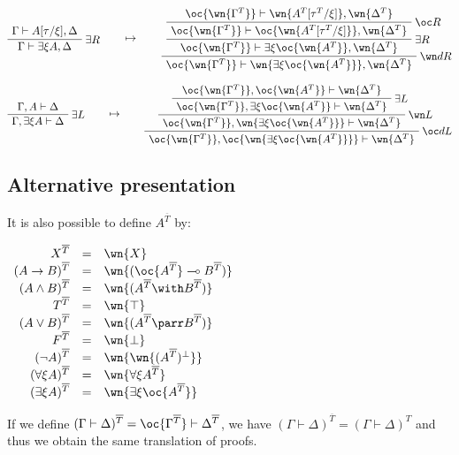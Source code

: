 \(\AxRule{\Gamma\vdash A[\tau/\xi],\Delta}
\LabelRule{\exists R}
\UnaRule{\Gamma\vdash \exists\xi A,\Delta}
\DisplayProof
\qquad\mapsto\qquad
\AxRule{\oc{\wn{\Gamma^T}}\vdash \wn{A^T[\tau^T/\xi]},\wn{\Delta^T}}
\LabelRule{\oc R}
\UnaRule{\oc{\wn{\Gamma^T}}\vdash \oc{\wn{A^T[\tau^T/\xi]}},\wn{\Delta^T}}
\LabelRule{\exists R}
\UnaRule{\oc{\wn{\Gamma^T}}\vdash \exists\xi \oc{\wn{A^T}},\wn{\Delta^T}}
\LabelRule{\wn d R}
\UnaRule{\oc{\wn{\Gamma^T}}\vdash \wn{\exists\xi \oc{\wn{A^T}}},\wn{\Delta^T}}
\DisplayProof\)

\(\AxRule{\Gamma,A\vdash \Delta}
\LabelRule{\exists L}
\UnaRule{\Gamma,\exists\xi A\vdash \Delta}
\DisplayProof
\qquad\mapsto\qquad
\AxRule{\oc{\wn{\Gamma^T}},\oc{\wn{A^T}}\vdash \wn{\Delta^T}}
\LabelRule{\exists L}
\UnaRule{\oc{\wn{\Gamma^T}},\exists\xi\oc{\wn{A^T}}\vdash \wn{\Delta^T}}
\LabelRule{\wn L}
\UnaRule{\oc{\wn{\Gamma^T}},\wn{\exists\xi\oc{\wn{A^T}}}\vdash \wn{\Delta^T}}
\LabelRule{\oc d L}
\UnaRule{\oc{\wn{\Gamma^T}},\oc{\wn{\exists\xi\oc{\wn{A^T}}}}\vdash \wn{\Delta^T}}
\DisplayProof\)

\subsection{Alternative presentation}\label{alternative-presentation}

It is also possible to define \(A^{\overline{T}}\) by:

\(\begin{array}{rcl}
X^{\overline{T}} &  = &  \wn{X} \\
(A\imp B)^{\overline{T}} &  = &  \wn{(\oc{A^{\overline{T}}}\limp B^{\overline{T}})} \\
(A\wedge B)^{\overline{T}} &  = &  \wn{(A^{\overline{T}} \with B^{\overline{T}})} \\
T^{\overline{T}} &  = &  \wn{\top} \\
(A\vee B)^{\overline{T}} &  = &  \wn{(A^{\overline{T}}\parr B^{\overline{T}})} \\
F^{\overline{T}} &  = &  \wn{\bot} \\
(\neg A)^{\overline{T}} &  = &  \wn{\wn{(A^{\overline{T}})\orth}} \\
(\forall\xi A)^{\overline{T}} &  = &  \wn{\forall\xi A^{\overline{T}}} \\
(\exists\xi A)^{\overline{T}} &  = &  \wn{\exists\xi \oc{A^{\overline{T}}}}
\end{array}\)

If we define
\((\Gamma\vdash\Delta)^{\overline{T}} = \oc{\Gamma^{\overline{T}}}\vdash \Delta^{\overline{T}}\),
we have \((\Gamma\vdash\Delta)^{\overline{T}} = (\Gamma\vdash\Delta)^T\)
and thus we obtain the same translation of proofs.

